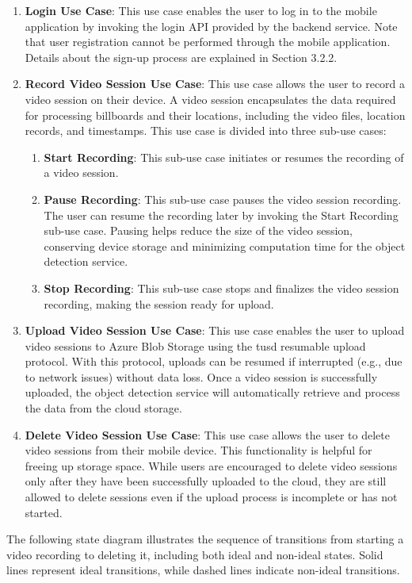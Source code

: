 \begin{enumerate}
    \item \textbf{Login Use Case}: This use case enables the user to log in to the mobile application by invoking the login API provided by the backend service. Note that user registration cannot be performed through the mobile application. Details about the sign-up process are explained in Section 3.2.2. %
    \item \textbf{Record Video Session Use Case}: This use case allows the user to record a video session on their device. A video session encapsulates the data required for processing billboards and their locations, including the video files, location records, and timestamps. This use case is divided into three sub-use cases:  
    \begin{enumerate}
        \item \textbf{Start Recording}: This sub-use case initiates or resumes the recording of a video session.  
        \item \textbf{Pause Recording}: This sub-use case pauses the video session recording. The user can resume the recording later by invoking the Start Recording sub-use case. Pausing helps reduce the size of the video session, conserving device storage and minimizing computation time for the object detection service.  
        \item \textbf{Stop Recording}: This sub-use case stops and finalizes the video session recording, making the session ready for upload.  
    \end{enumerate}
    \item \textbf{Upload Video Session Use Case}: This use case enables the user to upload video sessions to Azure Blob Storage using the tusd resumable upload protocol. With this protocol, uploads can be resumed if interrupted (e.g., due to network issues) without data loss. Once a video session is successfully uploaded, the object detection service will automatically retrieve and process the data from the cloud storage.  
    \item \textbf{Delete Video Session Use Case}: This use case allows the user to delete video sessions from their mobile device. This functionality is helpful for freeing up storage space. While users are encouraged to delete video sessions only after they have been successfully uploaded to the cloud, they are still allowed to delete sessions even if the upload process is incomplete or has not started.  
\end{enumerate}
The following state diagram illustrates the sequence of transitions from starting a video recording to deleting it, including both ideal and non-ideal states. Solid lines represent ideal transitions, while dashed lines indicate non-ideal transitions.

